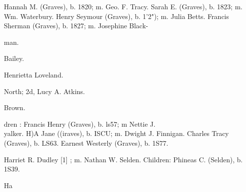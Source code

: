 \documentclass[oneside]{book}
\begin{document}
Hannah M. (Graves), b. 1820; m. Geo. F. Tracy. 
Sarah E. (Graves), b. 1823; m. Wm. Waterbury. 
Henry Seymour (Graves), b. 1'2"); m. Julia Betts. 
Francis Sherman (Graves), b. 1827; m. Josephine Black- 

man. 










Bailey. 





Henrietta Loveland. 





North; 2d, Lucy A. Atkins. 















Brown. 

dren : 
Francis Henry (Graves), b. ls57; m Nettie J. \\yalker. 
H)A Jane ((iraves), b. ISCU; m. Dwight J. Finnigan. 
Charles Tracy (Graves), b. LS63. 
Earnest Westerly (Graves), b. 1S77. 

Harriet R. Dudley [1] ; m. Nathan W. Selden. Children: 
Phineas C. (Selden), b. 1S39. 





























Ha 
\end{document}
